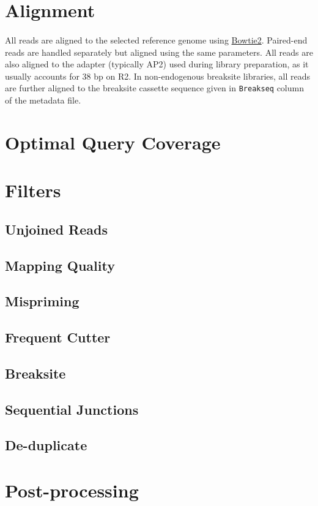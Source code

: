 \documentclass{article}
\begin{document}
\section{Alignment}

\paragraph{} All reads are aligned to the selected reference genome using \href{}{Bowtie2}. Paired-end reads are handled separately but aligned using the same parameters. All reads are also aligned to the adapter (typically AP2) used during library preparation, as it usually accounts for 38 bp on R2. In non-endogenous breaksite libraries, all reads are further aligned to the breaksite cassette sequence given in \texttt{Breakseq} column of the metadata file.

\section{Optimal Query Coverage}

\paragraph{} 


\section{Filters}
\subsection*{Unjoined Reads}

\subsection*{Mapping Quality}

\subsection*{Mispriming}

\subsection*{Frequent Cutter}

\subsection*{Breaksite}

\subsection*{Sequential Junctions}

\subsection*{De-duplicate}

\section{Post-processing}
\end{document}

